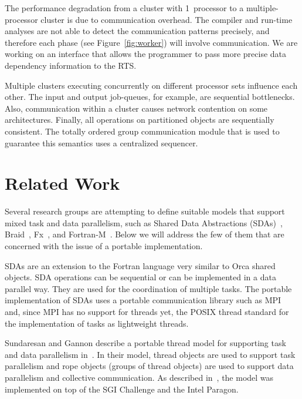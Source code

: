 \documentclass{article}
\begin{document}
The performance degradation from a cluster with 1~processor to a
multiple-processor cluster is due to communication overhead. The
compiler and run-time analyses are not able to detect the
communication patterns precisely, and therefore each phase (see
Figure~\ref{fig:worker}) will involve communication. We are working on
an interface that allows the programmer to pass more precise data
dependency information to the RTS.

Multiple clusters executing concurrently on different processor sets
influence each other. The input and output job-queues, for example,
are sequential bottlenecks. Also, communication within a cluster
causes network contention on some architectures. Finally, all
operations on partitioned objects are sequentially consistent. The
totally ordered group communication module that is used to guarantee
this semantics uses a centralized sequencer.



\section{Related Work}
\label{sec:RelatedWork}

Several research groups are attempting to define suitable models that
support mixed task and data parallelism, such as Shared Data
Abstractions (SDAs)~\cite{chapman96}, Braid~\cite{west95},
Fx~\cite{gross94}, and Fortran-M~\cite{foster94}. Below we will
address the few of them that are concerned with the issue of a
portable implementation.

SDAs are an extension to the Fortran language very similar to Orca
shared objects. SDA operations can be sequential or can be implemented
in a data parallel way. They are used for the coordination of multiple
tasks. The portable implementation of SDAs uses a portable
communication library such as MPI~\cite{mpi95} and, since MPI has no
support for threads yet, the POSIX thread standard for the
implementation of tasks as lightweight threads.

Sundaresan and Gannon describe a portable thread model for supporting
task and data parallelism in~\cite{sundaresan95}. In their model,
thread objects are used to support task parallelism and rope objects
(groups of thread objects) are used to support data parallelism and
collective communication. As described in~\cite{sundaresan95}, the
model was implemented on top of the SGI Challenge and the Intel
Paragon.
\end{document}
